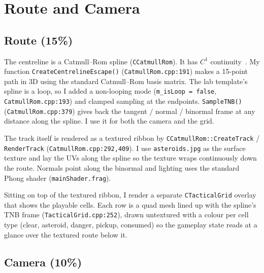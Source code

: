 \documentclass[11pt,a4paper]{article}
\begin{document}
\section{Route and Camera}

\subsection{Route (15\%)}

The centreline is a Catmull--Rom spline (\texttt{CCatmullRom}). It has $C^1$
continuity~\cite{catmullrom1974}. My function
\texttt{CreateCentrelineEscape()} (\texttt{CatmullRom.cpp:191})
makes a 15-point path in 3D using the standard Catmull--Rom basis matrix.
The lab template's spline is a loop, so I added a non-looping mode
(\texttt{m\_isLoop = false}, \texttt{CatmullRom.cpp:193}) and clamped
sampling at the endpoints. \texttt{SampleTNB()}
(\texttt{CatmullRom.cpp:379}) gives back the tangent / normal /
binormal frame at any distance along the spline. I use it for both the
camera and the grid.

The track itself is rendered as a textured ribbon by
\texttt{CCatmullRom::CreateTrack} / \texttt{RenderTrack}
(\texttt{CatmullRom.cpp:292,409}). I use
\texttt{asteroids.jpg} as the surface texture and lay the UVs along the
spline so the texture wraps continuously down the route. Normals point
along the binormal and lighting uses the standard Phong shader
(\texttt{mainShader.frag}).

Sitting on top of the textured ribbon, I render a separate
\texttt{CTacticalGrid} overlay that shows the playable cells. Each row
is a quad mesh lined up with the spline's TNB frame
(\texttt{TacticalGrid.cpp:252}), drawn untextured with a colour per
cell type (clear, asteroid, danger, pickup, consumed) so the gameplay
state reads at a glance over the textured route below it.


\subsection{Camera (10\%)}
\end{document}
